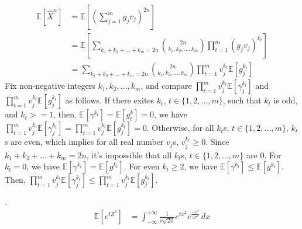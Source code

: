 \begin{align}
    \nonumber \mathbb{E}[\widehat{X}^n]&=\mathbb{E}\left[\left(\sum_{j=1}^{m}g_jv_j\right)^{2n}\right]\\
    \nonumber &=\mathbb{E}\left[\sum_{k_1+k_2+...+k_m=2n}\binom{2n}{k_1,k_2,...,k_m}\prod_{t=1}^{m}(g_jv_j)^{k_t} \right]\\
    \nonumber &=\sum_{k_1+k_2+...+k_m=2n}\binom{2n}{k_1,k_2,...,k_m}\prod_{t=1}^{m}v_j^{k_t}\mathbb{E}\left[g_j^{k_t}\right]
\end{align}
Fix non-negative integers $k_1,k_2,...,k_m$, and compare  $\prod_{t=1}^{m}v_j^{k_t}\mathbb{E}\left[\gamma_j^{k_t}\right]$ and $\prod_{t=1}^{m}v_j^{k_t}\mathbb{E}\left[g_j^{k_t}\right]$ as follows.
If there exites $k_t$, $t\in\{1,2,...,m\}$, such that $k_t$ is odd, and $k_t>=1$, then, $\mathbb{E}[\gamma^{k_t}]=\mathbb{E}[g^k_t]=0$, we have $\prod_{t=1}^{m}v_j^{k_t}\mathbb{E}\left[\gamma_j^{k_t}\right]=\prod_{t=1}^{m}v_j^{k_t}\mathbb{E}\left[g_j^{k_t}\right]=0$.
Otherwise, for all $k_t$s, $t\in\{1,2,...,m\}$, $k_t$s are even, which implies for all real number $v_j$s, $v_j^{k_t}\ge 0$. 
Since $k_1+k_2+...+k_m=2n$, it's impossible that all $k_t$s, $t\in \{1,2,...,m\}$ are 0.
For $k_t=0$, we have $\mathbb{E}[\gamma^{k_t}]=\mathbb{E}[g^{k_t}]$.
For even $k_t\ge 2$, we have $\mathbb{E}[\gamma^{k_t}]\le\mathbb{E}[g^{k_t}]$. 
Then, $\prod_{t=1}^{m}v_j^{k_t}\mathbb{E}\left[\gamma_j^{k_t}\right]\le \prod_{t=1}^{m}v_j^{k_t}\mathbb{E}\left[g_j^{k_t}\right]$.

.
\begin{align}
    \nonumber \mathbb{E}\left[ e^{tZ^2} \right]&=\int_{-\infty }^{+\infty }\frac{1}{\nu \sqrt{2\pi}}e^{tx^2}e^{\frac{-x^2}{2\nu ^2}}\,dx
\end{align}

